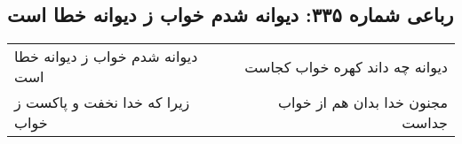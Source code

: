 \begin{center}
\section*{رباعی شماره ۳۳۵: دیوانه شدم خواب ز دیوانه خطا است}
\label{sec:0335}
\begin{longtable}{l p{0.5cm} r}
دیوانه شدم خواب ز دیوانه خطا است
&&
دیوانه چه داند کهره خواب کجاست
\\
زیرا که خدا نخفت و پاکست ز خواب
&&
مجنون خدا بدان هم از خواب جداست
\\
\end{longtable}
\end{center}
